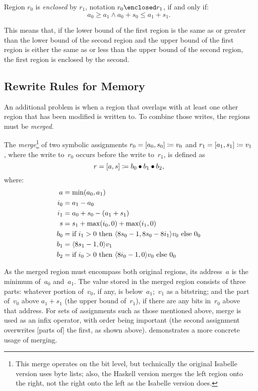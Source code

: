 \begin{definition}[Enclosure]\label{def:enc}
  Region $r_0$ is \emph{enclosed} by $r_1$, notation $r_0\enclosed r_1$,%
  if and only if:
  \begin{equation*}
    a_0\geq a_1\wedge a_0+s_0\leq a_1+s_1.
  \end{equation*}
\end{definition}
This means that, if the lower bound of the first region is the same as
or greater than the lower bound of the second region
and the upper bound of the first region is either the same as or less than
the upper bound of the second region, the first region is enclosed by the second.

\subsection{Rewrite Rules for Memory}\label{memory_rewrite}
An additional problem is when a region that overlaps with at least one other region
that has been modified is written to.
To combine those writes, the regions must be \emph{merged}.%
\begin{definition}[Merging]\label{def:merge}
  The \emph{merge}\footnote{%
    This merge operates on the bit level,
    but technically the original Isabelle version uses byte lists;
    also, the Haskell version merges the left region onto the right,
    not the right onto the left as the Isabelle version does.%
  }
  of two symbolic assignments
  $r_0=[a_0,s_0]\coloneqq v_0$ and $r_1=[a_1,s_1]\coloneqq v_1$,
  where the write to~$r_0$ occurs before the write to~$r_1$,
  is defined as
  \begin{equation}
    r=[a,s]\coloneqq b_0\bullet b_1\bullet b_2,
  \end{equation}
  where:
  \begin{align*}
    a   &= \min(a_0, a_1) \\
    i_0 &= a_1 - a_0 \\
    i_1 &= a_0 + s_0 - (a_1 + s_1) \\
    s   &= s_1 + \max(i_0, 0) + \max(i_1, 0) \\
    b_0 &= \text{if } i_1 > 0 \text{ then }
      \langle8 s_0 - 1, 8 s_0 - 8 i_1\rangle v_0 \text{ else } 0_0 \\
    b_1 &= \langle8 s_1 - 1, 0\rangle v_1 \\
    b_2 &= \text{if } i_0 > 0 \text{ then }
      \langle8 i_0-1, 0\rangle v_0 \text{ else } 0_0
  \end{align*}
\end{definition}
As the merged region must encompass both original regions,
its address~$a$ is the minimum of~$a_0$ and~$a_1$.
The value stored in the merged region consists of three parts:
whatever portion of~$v_0$, if any, is below~$a_1$;~$v_1$ as a bitstring;
and the part of~$v_0$ above $a_1+s_1$ (the upper bound of~$r_1$),
if there are any bits in~$r_0$ above that address.
For sets of assignments such as those mentioned above,
merge is used as an infix operator, with order being important
(the second assignment overwrites [parts of] the first, as shown above).
 demonstrates a more concrete usage of merging.

